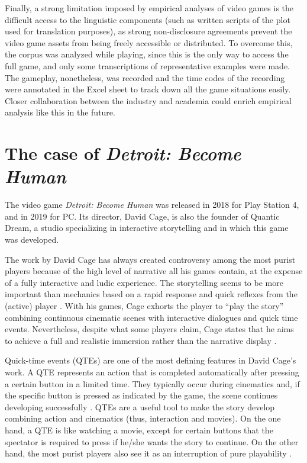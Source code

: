 \documentclass[output=paper]{langsci/langscibook}
\begin{document}
Finally, a strong limitation imposed by empirical analyses of video games is the difficult access to the linguistic components (such as written scripts of the plot used for translation purposes), as strong non-disclosure agreements prevent the video game assets from being freely accessible or distributed. To overcome this, the corpus was analyzed while playing, since this is the only way to access the full game, and only some transcriptions of representative examples were made. The gameplay, nonetheless, was recorded and the time codes of the recording were annotated in the Excel sheet to track down all the game situations easily. Closer collaboration between the industry and academia could enrich empirical analysis like this in the future.

\section{The case of \textit{Detroit: Become Human}}\label{detroit}

The video game \textit{Detroit: Become Human} was released in 2018 for Play Station 4, and in 2019 for PC. Its director, David Cage, is also the founder of Quantic Dream, a studio specializing in interactive storytelling and in which this game was developed.

The work by David Cage has always created controversy among the most purist players because of the high level of narrative all his games contain, at the expense of a fully interactive and ludic experience. The storytelling seems to be more important than mechanics based on a rapid response and quick reflexes from the (active) player \parencite{altozano17}. With his games, Cage exhorts the player to \enquote{play the story} combining continuous cinematic scenes with interactive dialogues and quick time events. Nevertheless, despite what some players claim, Cage states that he aims to achieve a full and realistic immersion rather than the narrative display \parencite{altozano17}.

Quick-time events (QTEs) are one of the most defining features in David Cage’s work. A QTE represents an action that is completed automatically after pressing a certain button in a limited time. They typically occur during cinematics and, if the specific button is pressed as indicated by the game, the scene continues developing successfully \parencite[131]{altozano17}. QTEs are a useful tool to make the story develop combining action and cinematics (thus, interaction and movies). On the one hand, a QTE is like watching a movie, except for certain buttons that the spectator is required to press if he/she wants the story to continue. On the other hand, the most purist players also see it as an interruption of pure playability \parencite[132]{altozano17}. 
\end{document}

